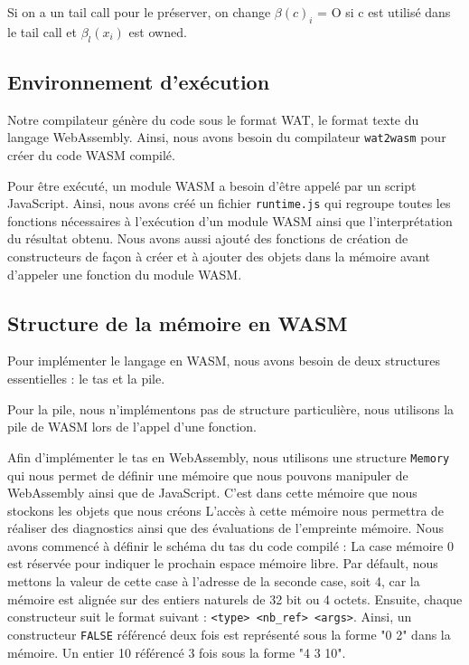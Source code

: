 \documentclass{rapportECL}
\begin{document}
Si on a un tail call pour le préserver, on change  $\beta(c)_i$ = O si c est utilisé dans le tail call et $\beta_l(x_i)$ est owned.

\subsection{Environnement d'exécution}

Notre compilateur génère du code sous le format WAT, le format texte du langage WebAssembly. Ainsi, nous avons besoin
du compilateur \verb|wat2wasm| pour créer du code WASM compilé.

Pour être exécuté, un module WASM a besoin d'être appelé par un script JavaScript. Ainsi, nous avons créé un fichier 
\verb|runtime.js| qui regroupe toutes les fonctions nécessaires à l'exécution d'un module WASM ainsi que l'interprétation
du résultat obtenu. Nous avons aussi ajouté des fonctions de création de constructeurs de façon à créer et à ajouter des objets 
dans la mémoire avant d'appeler une fonction du module WASM.

\subsection{Structure de la mémoire en WASM}

Pour implémenter le langage en WASM, nous avons besoin de deux structures essentielles : le tas et la pile.

\medskip

Pour la pile, nous n'implémentons pas de structure particulière, nous utilisons la pile de WASM lors de l'appel d'une fonction.

\medskip

Afin d'implémenter le tas en WebAssembly, nous utilisons une structure \verb|Memory| qui nous permet de définir une mémoire que 
nous pouvons manipuler de WebAssembly ainsi que de JavaScript.
C'est dans cette mémoire que nous stockons les objets que nous créons
L'accès à cette mémoire nous permettra de réaliser des diagnostics ainsi que des évaluations de l'empreinte mémoire.
Nous avons commencé à définir le schéma du tas du code compilé :
La case mémoire 0 est réservée pour indiquer le prochain espace mémoire libre. Par défault, nous mettons la valeur de cette case à 
l'adresse de la seconde case, soit 4, car la mémoire est alignée sur des entiers naturels de 32 bit ou 4 octets.
Ensuite, chaque constructeur suit le format suivant : \verb|<type> <nb_ref> <args>|. Ainsi, un constructeur \verb|FALSE| référencé 
deux fois est représenté sous la forme "0 2" dans la mémoire. Un entier 10 référencé 3 fois sous la forme "4 3 10".
\end{document}
